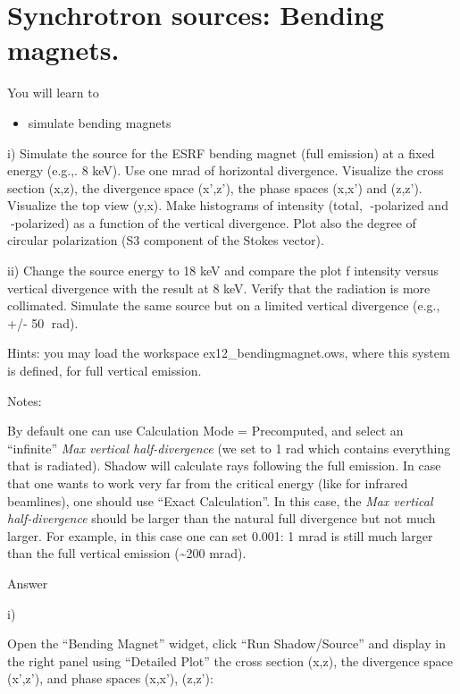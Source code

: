 \documentclass[]{article}
\providecommand{\tightlist}{%
  \setlength{\itemsep}{0pt}\setlength{\parskip}{0pt}}
\begin{document}
\section{Synchrotron sources: Bending
magnets.}\label{synchrotron-sources-bending-magnets.}

You will learn to

\begin{itemize}
\tightlist
\item
  simulate bending magnets
\end{itemize}

i) Simulate the source for the ESRF bending magnet (full emission) at a
fixed energy (e.g.,. 8 keV). Use one mrad of horizontal divergence.
Visualize the cross section (x,z), the divergence space (x',z'), the
phase spaces (x,x') and (z,z'). Visualize the top view (y,x). Make
histograms of intensity (total, -polarized and -polarized) as a
function of the vertical divergence. Plot also the degree of circular
polarization (S3 component of the Stokes vector).

ii) Change the source energy to 18 keV and compare the plot f intensity
versus vertical divergence with the result at 8 keV. Verify that the
radiation is more collimated. Simulate the same source but on a limited
vertical divergence (e.g., +/- 50 rad).

Hints: you may load the workspace ex12\_bendingmagnet.ows, where this
system is defined, for full vertical emission.

Notes:

By default one can use Calculation Mode = Precomputed, and select an
``infinite'' \emph{Max vertical half-divergence} (we set to 1 rad which
contains everything that is radiated). Shadow will calculate rays
following the full emission. In case that one wants to work very far
from the critical energy (like for infrared beamlines), one should use
``Exact Calculation''. In this case, the \emph{Max vertical
half-divergence }should be larger than the natural full divergence but
not much larger. For example, in this case one can set 0.001: 1 mrad is
still much larger than the full vertical emission (\textasciitilde{}200
mrad).

Answer

i)

Open the ``Bending Magnet'' widget, click ``Run Shadow/Source'' and
display in the right panel using ``Detailed Plot'' the cross section
(x,z), the divergence space (x',z'), and phase spaces (x,x'), (z,z'):
\end{document}
